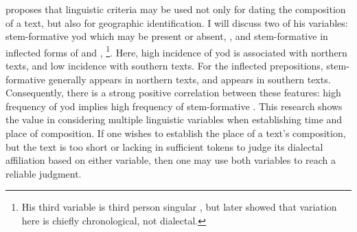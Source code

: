 
\Textcite{Tho_Middle93} proposes that linguistic criteria may be used not only for dating the composition of a text, but also for geographic identification. I will discuss two of his variables:  stem-formative yod which may be present or absent, \eg {}, and stem-formative  in inflected forms of  and , \eg {}\footnote{His third variable is third person singular , but \textcite{Rod_Datable98} later showed that variation here is chiefly chronological, not dialectal.}. Here, high incidence of yod is associated with northern texts, and low incidence with southern texts. For the inflected prepositions, stem-formative  generally appears in northern texts, and  appears in southern texts. Consequently, there is a strong positive correlation between these features: high frequency of yod implies high frequency of stem-formative . This research shows the value in considering multiple linguistic variables when establishing time and place of composition. If one wishes to establish the place of a text's composition, but the text is too short or lacking in sufficient tokens to judge its dialectal affiliation based on either variable, then one may use both variables to reach a reliable judgment.

